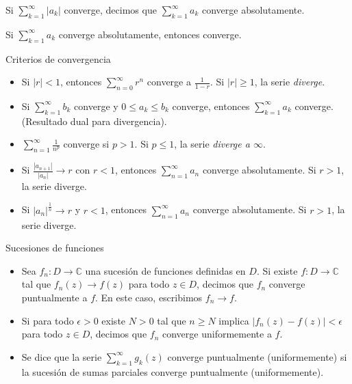 \documentclass[spanish,presentation]{beamer}
\begin{document}
\begin{frame}[label=sec-1-3]{}
\begin{definition}
Si \(\sum_{k=1}^{\infty}|a_{k}|\) converge, decimos que
\(\sum_{k=1}^{\infty}a_{k}\) \alert{converge absolutamente}.
\end{definition}

\begin{theorem}
Si \(\sum_{k=1}^{\infty}a_{k}\) converge absolutamente, entonces
converge. 
\end{theorem}
\end{frame}

\begin{frame}[label=sec-1-4]{Criterios de convergencia}
\begin{theorem}
\begin{itemize}
\item Si \(|r|<1\), entonces \(\sum_{n=0}^{\infty}r^{n}\) converge a
\(\frac{1}{1-r}\). Si \(|r|\geq 1\), la serie \emph{diverge}.
\item Si \(\sum_{k=1}^{\infty}b_{k}\) converge y \(0\leq a_{k}\leq
      b_{k}\) converge, entonces \(\sum_{k=1}^{\infty}a_{k}\)
      converge. (Resultado dual para divergencia).
\item \(\sum_{n=1}^{\infty}\frac{1}{n^{p}}\) converge si \(p>1\). Si
\(p\leq 1\), la serie \emph{diverge a \(\infty\)}.
\item Si \(\frac{|a_{n+1}|}{|a_{n}|}\to r\) con \(r<1\), entonces
\(\sum_{n=1}^{\infty}a_{n}\) converge absolutamente. Si \(r>1\),
la serie diverge.
\item Si \(|a_{n}|^{\frac{1}{n}}\to r\) y \(r<1\), entonces
\(\sum_{n=1}^{\infty}a_{n}\) converge absolutamente. Si \(r>1\),
la serie diverge.
\end{itemize}
\end{theorem}
\end{frame}


\begin{frame}[label=sec-1-5]{Sucesiones de funciones}
\begin{definition}
\begin{itemize}
\item Sea \(f_{n}\colon D\to \mathbb{C}\) una sucesión de funciones
definidas en \(D\). Si existe \(f\colon D\to \mathbb{C}\) tal
que \(f_{n}(z)\to f(z)\) para todo \(z\in D\), decimos que
\(f_{n}\) \alert{converge puntualmente} a \(f\). En este caso,
escribimos \(f_{n}\to f\).
\item Si para todo \(\epsilon>0\) existe \(N>0\) tal que \(n\geq N\)
implica \(|f_{n}(z)-f(z)|<\epsilon\) para todo \(z\in D\),
decimos que \(f_{n}\) \alert{converge uniformemente} a \(f\).
\item Se dice que la serie \(\sum_{k=1}^{\infty}g_{k}(z)\) converge
puntualmente (uniformemente) si la sucesión de sumas parciales
converge puntualmente (uniformemente).
\end{itemize}
\end{definition}
\end{frame}
\end{document}
